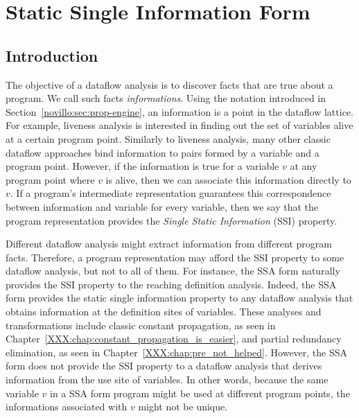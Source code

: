 \chapter{Static Single Information Form }
\label{chap:ssi}

\graphicspath{{img/}{ssi/img/}{part2/ssi/img/}}

\section{Introduction}
\label{sec:ssi:pereira:intro}

The objective of a dataflow analysis is to discover facts that are true about a
program.
We call such facts {\em informations}.
Using the notation introduced in Section~\ref{novillo:sec:prop-engine}, an
information is a point in the dataflow lattice.
For example, liveness analysis is interested in finding out the set of
variables alive at a certain program point.
Similarly to liveness analysis, many other classic dataflow approaches bind
information to pairs formed by a variable and a program point.
However, if the information is true for a variable $v$ at any program point where
$v$ is alive, then we can associate this information directly to $v$.
If a program's intermediate representation guarantees this correspondence between
information and variable for every variable, then we say that the program
representation provides the {\em Single Static Information} (SSI) property.

Different dataflow analysis might extract information from different program
facts.
Therefore, a program representation may afford the SSI property to some dataflow
analysis, but not to all of them.
For instance, the SSA form naturally provides the SSI property to the reaching
definition analysis.
Indeed, the SSA form provides the static single information property to any
dataflow analysis that obtains information at the definition sites of
variables.
These analyses and transformations include classic constant propagation, as
seen in Chapter~\ref{XXX:chap:constant_propagation_is_easier}, and partial redundancy elimination, as seen in Chapter~\ref{XXX:chap:pre_not_helped}.
However, the SSA form does not provide the SSI property to a dataflow analysis
that derives information from the use site of variables.
In other words, because the same variable $v$ in a SSA form program might be used
at different program points, the informations associated with $v$ might not be
unique.

